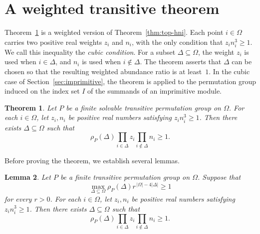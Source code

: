 \documentclass[10pt]{amsart}
\newtheorem{theorem}{Theorem}[section]
\newtheorem{lemma}[theorem]{Lemma}
\theoremstyle{definition}
\renewcommand{\ge}{\geqslant}
\numberwithin{equation}{section}
\numberwithin{table}{section}
\begin{document}
\section{A weighted transitive theorem}
\label{sec:weighted}

Theorem~\ref{thm:weighted} is a weighted version of
Theorem~\ref{thm:top-hni}. Each point $i\in\Omega$ carries two positive real
weights $z_i$ and $n_i$, with the only condition that $z_i n_i^3\ge1$. We
call this inequality the \emph{cubic condition}. For a subset
$\Delta\subseteq\Omega$, the weight $z_i$ is used when $i\in\Delta$, and
$n_i$ is used when $i\notin\Delta$. The theorem asserts that $\Delta$ can be
chosen so that the resulting weighted abundance ratio is at least~$1$. In
the cubic case of Section~\ref{sec:imprimitive}, the theorem is applied to
the permutation group induced on the index set $I$ of the summands of an
imprimitive module.

\begin{theorem}\label{thm:weighted}
Let $P$ be a finite solvable transitive permutation group on $\Omega$.
For each $i\in\Omega$, let $z_i,n_i$ be positive real numbers satisfying
$z_i n_i^{3}\ge1$. Then there exists $\Delta\subseteq\Omega$ such that
$$
  \rho_P(\Delta)\prod_{i\in\Delta}z_i
  \prod_{i\notin\Delta}n_i\ge1.
$$
\end{theorem}

Before proving the theorem, we establish several lemmas.

\begin{lemma}\label{lem:symmetrise}
Let $P$ be a finite transitive permutation group on $\Omega$. Suppose that
\begin{equation}\label{eq:one-parameter}
  \max_{\Delta\subseteq\Omega}
  \rho_P(\Delta)r^{\,|\Omega|-4|\Delta|}\ge1
\end{equation}
for every $r>0$. For each $i\in\Omega$, let $z_i,n_i$ be positive real
numbers satisfying $z_i n_i^3\ge1$. Then there exists
$\Delta\subseteq\Omega$ such that
$$
  \rho_P(\Delta)\prod_{i\in\Delta}z_i
  \prod_{i\notin\Delta}n_i\ge1.
$$
\end{lemma}
\end{document}
